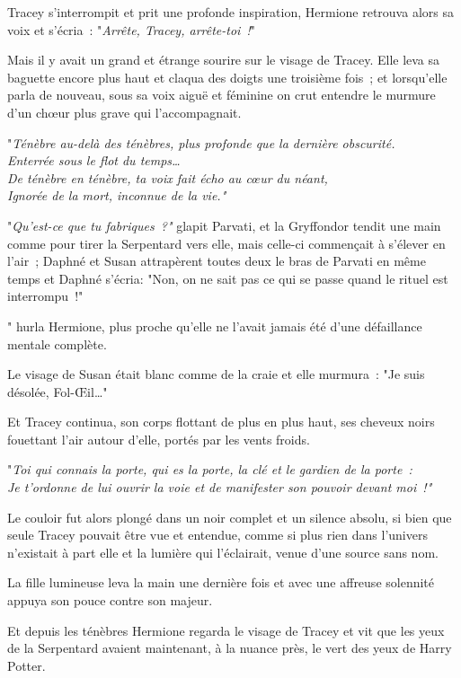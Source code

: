 Tracey s'interrompit et prit une profonde inspiration, Hermione retrouva alors sa voix et s'écria~: "\emph{Arrête, Tracey, arrête-toi~!}"

Mais il y avait un grand et étrange sourire sur le visage de Tracey. Elle leva sa baguette encore plus haut et claqua des doigts une troisième fois~; et lorsqu'elle parla de nouveau, sous sa voix aiguë et féminine on crut entendre le murmure d'un chœur plus grave qui l'accompagnait.

"\emph{Ténèbre au-delà des ténèbres, plus profonde que la dernière obscurité.\\
Enterrée sous le flot du temps…\\
De ténèbre en ténèbre, ta voix fait écho au cœur du néant,\\
Ignorée de la mort, inconnue de la vie."}

"\emph{Qu'est-ce que tu fabriques~?"} glapit Parvati, et la Gryffondor tendit une main comme pour tirer la Serpentard vers elle, mais celle-ci commençait à s'élever en l'air~; Daphné et Susan attrapèrent toutes deux le bras de Parvati en même temps et Daphné s'écria: "Non, on ne sait pas ce qui se passe quand le rituel est interrompu~!"

" hurla Hermione, plus proche qu'elle ne l'avait jamais été d'une défaillance mentale complète.

Le visage de Susan était blanc comme de la craie et elle murmura~: "Je suis désolée, Fol-Œil…"

Et Tracey continua, son corps flottant de plus en plus haut, ses cheveux noirs fouettant l'air autour d'elle, portés par les vents froids.

"\emph{Toi qui connais la porte, qui es la porte, la clé et le gardien de la porte~:\\ Je t'ordonne de lui ouvrir la voie et de manifester son pouvoir devant moi~!"}

Le couloir fut alors plongé dans un noir complet et un silence absolu, si bien que seule Tracey pouvait être vue et entendue, comme si plus rien dans l'univers n'existait à part elle et la lumière qui l'éclairait, venue d'une source sans nom.

La fille lumineuse leva la main une dernière fois et avec une affreuse solennité appuya son pouce contre son majeur.

Et depuis les ténèbres Hermione regarda le visage de Tracey et vit que les yeux de la Serpentard avaient maintenant, à la nuance près, le vert des yeux de Harry Potter.

